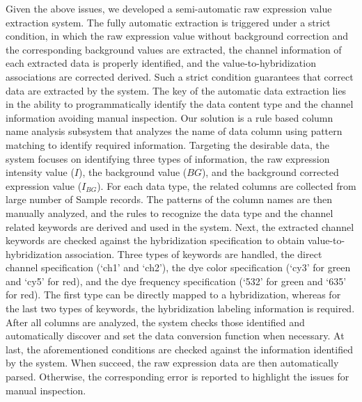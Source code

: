 Given the above issues, we developed a semi-automatic raw expression value
extraction system.
%
The fully automatic extraction is triggered under a strict condition, in which
the raw expression value without background correction and the corresponding
background values are extracted, the channel information of each extracted
data is properly identified, and the value-to-hybridization associations are
corrected derived.
%
Such a strict condition guarantees that correct data are extracted by the
system.
%
The key of the automatic data extraction lies in the ability to
programmatically identify the data content type and the channel information
avoiding manual inspection.
%
Our solution is a rule based column name analysis subsystem that analyzes the
name of data column using pattern matching to identify required information.
%
Targeting the desirable data, the system focuses on identifying three types of
information, the raw expression intensity value ($I$), the background value
($BG$), and the background corrected expression value ($I_{BG}$).
%
For each data type, the related columns are collected from large number of
Sample records.  The patterns of the column names are then manually analyzed,
and the rules to recognize the data type and the channel related keywords are
derived and used in the system.
%
Next, the extracted channel keywords are checked against the hybridization
specification to obtain value-to-hybridization association.
%
Three types of keywords are handled, the direct channel specification (`ch1'
and `ch2'), the dye color specification (`cy3' for green and `cy5' for red),
and the dye frequency specification (`532' for green and `635' for red).
%
The first type can be directly mapped to a hybridization, whereas for the
last two types of keywords, the hybridization labeling information is
required.
%
After all columns are analyzed, the system checks those identified and
automatically discover and set the data conversion function when necessary.
%
At last, the aforementioned conditions are checked against the information
identified by the system.
%
When succeed, the raw expression data are then automatically parsed.
Otherwise, the corresponding error is reported to highlight the issues for
manual inspection.
%
%







